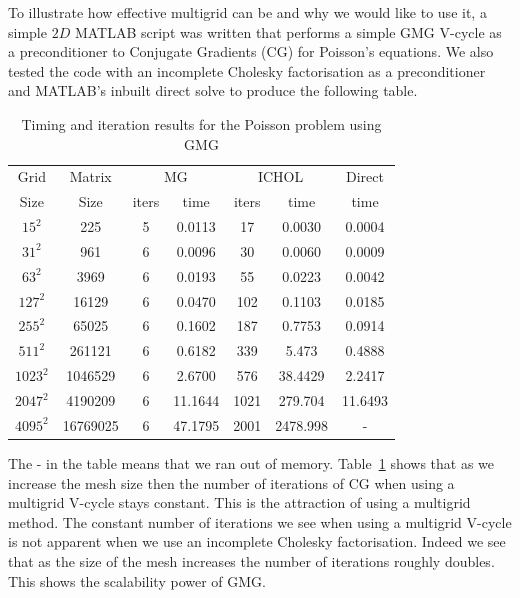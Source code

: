 \documentclass[11pt]{article}
\numberwithin{equation}{section}    %
\begin{document}
To illustrate how effective multigrid can be and why we would like to use it, a simple $2D$ MATLAB script was written that performs a simple GMG V-cycle as a preconditioner to Conjugate Gradients (CG) for Poisson's equations. We also tested the code with an incomplete Cholesky factorisation as a preconditioner and MATLAB's inbuilt direct solve to produce the following table.
\begin{table}[h]
\centering
\caption{}
\begin{tabular}{*{7}{c}}
\hline
 Grid  &      Matrix & \multicolumn{2}{c}{MG} & \multicolumn{2}{c}{ICHOL}& Direct  \\
 Size     &     Size    &       iters       &        time       &       iters       &        time       &        time     \\
\hline
$15  ^2 $ &    225    &    5   &    0.0113   &    17    &    0.0030    &    0.0004  \\
$31  ^2 $ &    961    &    6   &    0.0096    &    30    &    0.0060    &  0.0009 \\
$63  ^2 $ &    3969    &    6   &    0.0193    &    55    &    0.0223    &    0.0042 \\
$127 ^2$   &    16129    &    6   &    0.0470    &    102    &    0.1103    &    0.0185  \\
$255 ^2$   &    65025    &    6   &    0.1602    &    187    &     0.7753    &    0.0914  \\
$511 ^2$   &    261121    &    6   &    0.6182    &    339    &    5.473    &    0.4888  \\
$1023^2$    &    1046529    &    6   &    2.6700   &   576    &   38.4429    &    2.2417   \\
$2047^2$    &    4190209    &    6    &    11.1644    &    1021    &    279.704    & 11.6493  \\
$4095^2$      &      16769025     &      6      &    47.1795    &     2001    &    2478.998    &    -  \\

\hline
\end{tabular}
\caption{Timing and iteration results for the Poisson problem using GMG}
\label{tab:multitest}
\end{table}
The - in the table means that we ran out of memory. Table~\ref{tab:multitest} shows that as we increase the mesh size then the number of iterations of CG when using a multigrid V-cycle stays constant. This is the attraction of using a multigrid method. The constant number of iterations we see when using a multigrid V-cycle is not apparent when we use an incomplete Cholesky factorisation. Indeed we see that as the size of the mesh increases the number of iterations roughly doubles. This shows the scalability power of GMG.
\end{document}
